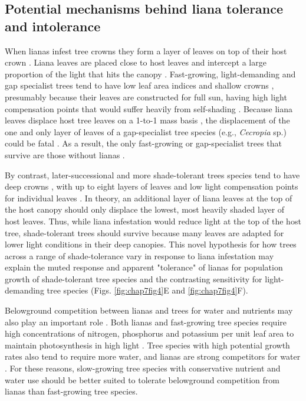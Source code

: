 \documentclass[b5paper,justified]{tufte-book} %
\begin{document}
\begin{fullwidth}
\subsection{Potential mechanisms behind liana tolerance and intolerance}
When lianas infest tree crowns they form a layer of leaves on top of their host crown \citep{Avalos1999}. Liana leaves are placed close to host leaves and intercept a large proportion of the light that hits the canopy \citep{Stevens1987, Avalos1999}. Fast-growing, light-demanding and gap specialist trees tend to have low leaf area indices \citep[leaf area per ground area or LAI;][]{Kitajima2005} and shallow crowns \citep{Kohyama2003}, presumably because their leaves are constructed for full sun, having high light compensation points that would suffer heavily from self-shading \citep{Kitajima1994}. Because liana leaves displace host tree leaves on a 1-to-1 mass basis \citep{Kira1971}, the displacement of the one and only layer of leaves of a gap-specialist tree species (e.g., \textit{Cecropia} sp.) could be fatal \citep{Kitajima2005}. As a result, the only fast-growing or gap-specialist trees that survive are those without lianas \citep[as observed by][]{Clark1990}.
 
By contrast, later-successional and more shade-tolerant trees species tend to have deep crowns \citep{Kohyama2003}, with up to eight layers of leaves and low light compensation points for individual leaves \citep{Kitajima2005}. In theory, an additional layer of liana leaves at the top of the host canopy should only displace the lowest, most heavily shaded layer of host leaves. Thus, while liana infestation would reduce light at the top of the host tree, shade-tolerant trees should survive because many leaves are adapted for lower light conditions in their deep canopies. This novel hypothesis for how trees across a range of shade-tolerance vary in response to liana infestation may explain the muted response and apparent "tolerance" of lianas for population growth of shade-tolerant tree species and the contrasting sensitivity for light-demanding tree species (Figs. \ref{fig:chap7fig4}E and \ref{fig:chap7fig4}F). 

Belowground competition between lianas and trees for water and nutrients may also play an important role \citep{Dillenburg1993, Schnitzer2005}. Both lianas and fast-growing tree species require high concentrations of nitrogen, phosphorus and potassium per unit leaf area to maintain photosynthesis in high light \citep{Asner2012}. Tree species with high potential growth rates also tend to require more water, and lianas are strong competitors for water \citep{Cai2009, Alvarez-Cansino2015}. For these reasons, slow-growing tree species with conservative nutrient and water use should be better suited to tolerate belowground competition from lianas than fast-growing tree species. 


\end{fullwidth}
\end{document}
